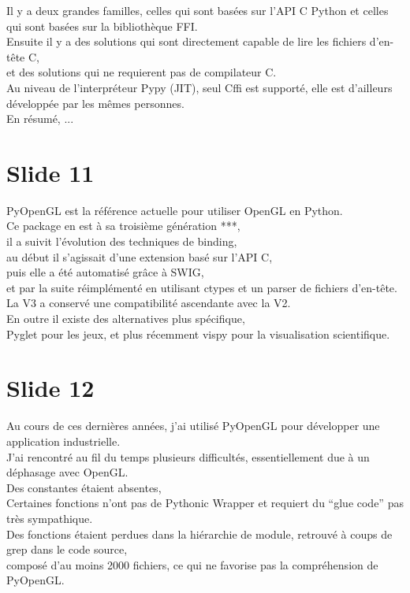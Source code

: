 \documentclass[12pt]{article}
\begin{document}
\noindent%
Il y a deux grandes familles, celles qui sont basées sur l'API C Python et celles qui sont basées
sur la bibliothèque FFI. \\

\noindent%
Ensuite il y a des solutions qui sont directement capable de lire les fichiers d'en-tête C, \\
et des solutions qui ne requierent pas de compilateur C. \\

\noindent%
Au niveau de l'interpréteur Pypy (JIT), seul Cffi est supporté, elle est d'ailleurs développée par
les mêmes personnes. \\

\noindent%
En résumé, ...

\section{Slide 11}

\noindent%
PyOpenGL est la référence actuelle pour utiliser OpenGL en Python. \\

\noindent%
Ce package en est à sa troisième génération ***, \\
il a suivit l'évolution des techniques de binding, \\
au début il s'agissait d'une extension basé sur l'API C, \\
puis elle a été automatisé grâce à SWIG, \\
et par la suite réimplémenté en utilisant ctypes et un parser de fichiers d'en-tête. \\

\noindent%
La V3 a conservé une compatibilité ascendante avec la V2. \\

\noindent%
En outre il existe des alternatives plus spécifique, \\
Pyglet pour les jeux, et plus récemment vispy pour la visualisation scientifique. \\

\section{Slide 12}

\noindent%
Au cours de ces dernières années, j'ai utilisé PyOpenGL pour développer une application
industrielle. \\

\noindent%
J'ai rencontré au fil du temps plusieurs difficultés, essentiellement due à un déphasage avec OpenGL. \\
Des constantes étaient absentes, \\
Certaines fonctions n'ont pas de Pythonic Wrapper et requiert du ``glue code'' pas très sympathique. \\
Des fonctions étaient perdues dans la hiérarchie de module, retrouvé à coups de grep dans le code source, \\
composé d'au moins 2000 fichiers, ce qui ne favorise pas la compréhension de PyOpenGL. \\
\end{document}
